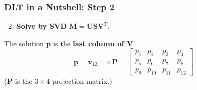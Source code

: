 \begin{frame}
  \frametitle{DLT in a Nutshell: Step 2}
    \begin{enumerate}
        \setcounter{enumi}{1}
        \item \textbf{Solve by SVD} $\mathbf{M} = \mathbf{U} \mathbf{S} \mathbf{V}^T$.
    \end{enumerate}
    \vspace{0.5cm}
    \begin{center}
        The solution $\mathbf{p}$ is the \textbf{last column of $\mathbf{V}$}.
        \vspace{0.5cm}
        $$
        \mathbf{p} = \mathbf{v}_{12} \implies \mathbf{P} = \begin{bmatrix}
            p_1 & p_2 & p_3 & p_4 \\
            p_5 & p_6 & p_7 & p_8 \\
            p_9 & p_{10} & p_{11} & p_{12}
        \end{bmatrix}
        $$
        \footnotesize{($\mathbf{P}$ is the $3 \times 4$ projection matrix.)}
    \end{center}
\end{frame}

